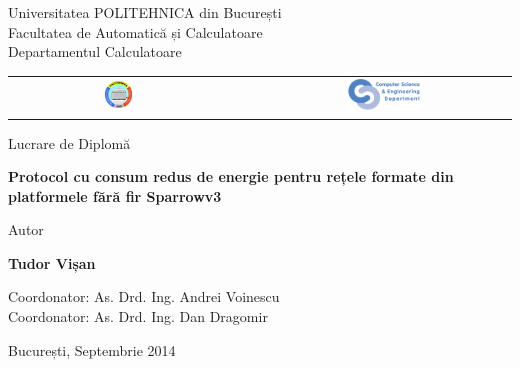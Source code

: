 


\pagestyle{empty}
\sffamily

\noindent
\begin{center}
	\Large
	Universitatea POLITEHNICA din București\\
	Facultatea de Automatică și Calculatoare\\
	Departamentul Calculatoare\\
	\begin{table}[h]
		\begin{center}
			\begin{tabular}{cccc}
				\includegraphics[width=0.13\textwidth]
				{img/upb.png}
				& & &
				\includegraphics[width=0.30\textwidth]
				{img/cs.png}
			\end{tabular}
		\end{center}
	\end{table}
\end{center}

\vfill\vfill
\begin{center}
	\Large
	Lucrare de Diplomă\\
\end{center}

\vfill
\begin{center}
	\HUGE\bfseries
	Protocol cu consum redus de energie pentru rețele formate din
	platformele fără fir Sparrowv3\\
	\vfill
	\large
\end{center}

\vfill
\begin{center}
	\Large
	Autor
\end{center}

\begin{center}
	\huge\bfseries
	Tudor Vișan
\end{center}

\vfill\vfill\vfill
\begin{center}
	\Large
	Coordonator: As. Drd. Ing. Andrei Voinescu\\
	Coordonator: As. Drd. Ing. Dan Dragomir\\
\end{center}

\vfill
\begin{center}
	\large
	București, Septembrie 2014
\end{center}

\cleardoublepage


